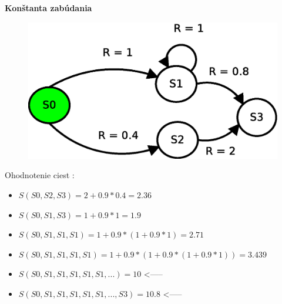 \documentclass[xcolor=dvipsnames]{beamer}
\begin{document}
\begin{frame}{\bf Konštanta zabúdania }

  \begin{figure}[!htb]
  \centering
  \includegraphics[scale=.5]{../diagrams/rf_cycle_states.eps}
  \end{figure}

  Ohodnotenie ciest :
  \begin{itemize}
    \item $S(S0, S2, S3) = 2 + 0.9*0.4 = 2.36$
    \item $S(S0, S1, S3) = 1 + 0.9*1 = 1.9$
    \item $S(S0, S1, S1, S1) = 1 + 0.9*(1 + 0.9*1) = 2.71 $
    \item $S(S0, S1, S1, S1, S1) = 1 + 0.9*(1 + 0.9*(1 + 0.9*1)) = 3.439$
    \item $S(S0, S1, S1, S1, S1, S1, ...) = 10$ <-----
    \item $S(S0, S1, S1, S1, S1, S1, ..., S3) = 10.8$ <-----
  \end{itemize}

\end{frame}
\end{document}
